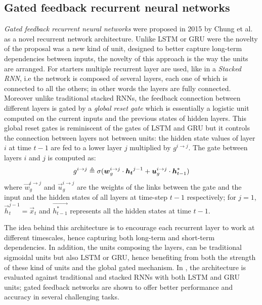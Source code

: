 \subsection{Gated feedback recurrent neural networks}

\textit{Gated feedback recurrent neural networks} were proposed in 2015 by  Chung et al. \cite{gatedFeedback} as a novel recurrent network architecture.
Unlike LSTM or GRU were the novelty of the proposal was a new kind of unit, designed to better capture long-term dependencies between inputs, the novelty of this approach is the way the units are arranged. For starters multiple recurrent layer are used, like in a \textit{Stacked RNN}, i.e the network is composed of several layers, each one of which is connected to all the others; in other words the layers are fully connected. Moreover unlike traditional stacked RNNs, the feedback connection between different layers is gated by a \textit{global reset gate} which is essentially a logistic unit computed on the current inputs and the previous states of hidden layers. This global reset gates is reminiscent of the gates of LSTM and GRU but it controls the connection between layers not between units: the hidden state values of layer $i$ at time $t-1$ are fed to a lower layer $j$ multiplied by $g^{i\rightarrow j}$.
The gate between layers $i$ and $j$ is computed as:
\begin{equation}
g^{i\rightarrow j} \triangleq \sigma(\boldsymbol{w}_g^{i\rightarrow j} \cdot \boldsymbol{h_t}^{j-1} + \boldsymbol{u}_g^{i\rightarrow j} \cdot \boldsymbol{h}^*_{t-1})
\end{equation}
where $\vec{w}_g^{i\rightarrow j}$ and $\vec{u}_g^{i\rightarrow j}$ are the weights of the links between the gate and the input and the hidden states of all layers at time-step $t-1$ respectively; for $j=1$,  $\vec{h}_t^{j-1}=\vec{x}_t $  and $\vec{h^*_{t-1}}$ represents all the hidden states at time $t-1$.

The idea behind this architecture is to encourage each recurrent layer to work at different timescales, hence capturing both long-term and short-term dependencies. In addition, the units composing the layers, can be traditional sigmoidal units but also LSTM or GRU, hence benefiting from both the strength of these kind of units and the global gated mechanism. In \cite{gatedFeedback}, the architecture is evaluated against traditional and stacked RNNs with both LSTM and GRU units; gated feedback networks are shown to offer better performance and accuracy in several challenging tasks.


